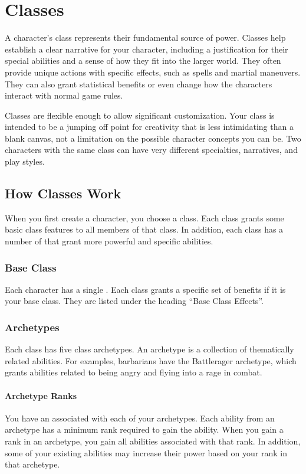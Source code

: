 \chapter{Classes}\label{Classes}

    A character's class represents their fundamental source of power.
    Classes help establish a clear narrative for your character, including a justification for their special abilities and a sense of how they fit into the larger world.
    They often provide unique actions with specific effects, such as spells and martial maneuvers.
    They can also grant statistical benefits or even change how the characters interact with normal game rules.

    Classes are flexible enough to allow significant customization.
    Your class is intended to be a jumping off point for creativity that is less intimidating than a blank canvas, not a limitation on the possible character concepts you can be.
    Two characters with the same class can have very different specialties, narratives, and play styles.

\section{How Classes Work}
    When you first create a character, you choose a class.
    Each class grants some basic class features to all members of that class.
    In addition, each class has a number of  that grant more powerful and specific abilities.

    \subsection{Base Class}\label{Base Class}
        Each character has a single .
        Each class grants a specific set of benefits if it is your base class.
        They are listed under the heading ``Base Class Effects''.

    \subsection{Archetypes}\label{Archetypes}
        Each class has five class archetypes.
        An archetype is a collection of thematically related abilities.
        For examples, barbarians have the Battlerager archetype, which grants abilities related to being angry and flying into a rage in combat.

        \subsubsection{Archetype Ranks}\label{Archetype Ranks}
            You have an  associated with each of your archetypes.
            Each ability from an archetype has a minimum rank required to gain the ability.
            When you gain a rank in an archetype, you gain all abilities associated with that rank.
            In addition, some of your existing abilities may increase their power based on your rank in that archetype.

